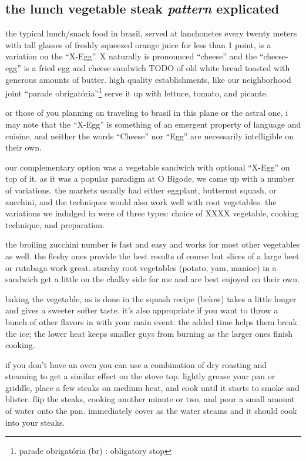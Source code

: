 \subsection{the lunch vegetable steak \textit{pattern} explicated}

the typical lunch/snack food in brasil, served at lanchonetes every
twenty meters with tall glasses of freshly squeezed orange juice for
less than 1 point, is a variation on the ``X-Egg''. X naturally is
pronounced ``cheese'' and the ``cheese-egg'' is a fried egg and cheese
sandwich TODO of old white bread toasted with generous amounts of
butter. high quality establishments, like our neighborhood joint
``parade obrigat\'{o}ria''\footnote{parade obrigat\'{o}ria (br) :
obligatory stop} serve it up with lettuce, tomato, and picante.

or those of you planning on traveling to brasil in this plane or the
astral one, i may note that the ``X-Egg'' is something of an emergent
property of language and cuisine, and neither the words ``Cheese'' nor
``Egg'' are necessarily intelligible on their own.

our complementary option was a vegetable sandwich with optional
``X-Egg'' on top of it. as it was a popular paradigm at O Bigode, we
came up with a number of variations. the markets usually had either
eggplant, butternut squash, or zucchini, and the techniques would also
work well with root vegetables. the variations we indulged in were of
three types: choice of XXXX vegetable, cooking technique, and
preparation.

the broiling zucchini number is fast and easy and works for most other
vegetables as well. the fleshy ones provide the best results of course
but slices of a large beet or rutabaga work great. starchy root
vegetables (potato, yam, manioc) in a sandwich get a little on the
chalky side for me and are best enjoyed on their own.

baking the vegetable, as is done in the squash recipe (below) takes a
little longer and gives a sweeter softer taste. it's also appropriate
if you want to throw a bunch of other flavors in with your main event:
the added time helps them break the ice; the lower heat keeps smaller
guys from burning as the larger ones finish cooking.

if you don't have an oven you can use a combination of dry roasting
and steaming to get a similar effect on the stove top. lightly grease
your pan or griddle, place a few steaks on medium heat, and cook until
it starts to smoke and blister. flip the steaks, cooking another
minute or two, and pour a small amount of water onto the
pan. immediately cover as the water steams and it should cook into
your steaks.

